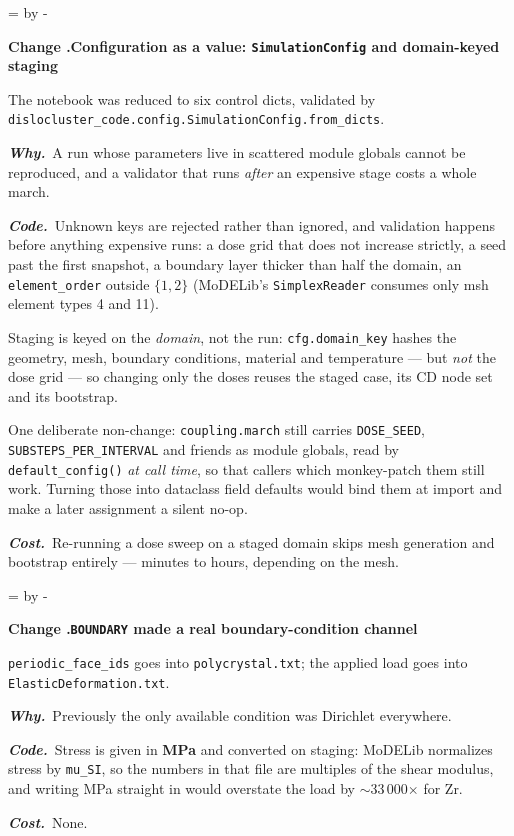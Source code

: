 \documentclass[11pt,a4paper]{article}
\newcommand{\code}[1]{\texttt{\small #1}}
\newcommand{\needlines}[1]{%
  \par\dimen0=\pagegoal \advance\dimen0 by -\pagetotal
  \ifdim\dimen0<#1\baselineskip \newpage \fi}
\newcounter{chg}
\newcommand{\change}[1]{%
  \needlines{4}%
  \refstepcounter{chg}%
  \par\medskip\noindent
  {\bfseries\boldmath Change \thechg.\quad #1}%
  \par\nobreak\smallskip}
\newcommand{\why}[1]{\par\noindent\textbf{\itshape Why.}\ #1\par}
\newcommand{\impact}[1]{\par\noindent\textbf{\itshape Code.}\ #1\par}
\newcommand{\cost}[1]{\par\noindent\textbf{\itshape Cost.}\ #1\par}
\begin{document}
\change{Configuration as a value: \code{SimulationConfig} and domain-keyed staging}
\label{chg:config}
The notebook was reduced to six control dicts, validated by
\code{dislocluster\_code.config.\allowbreak SimulationConfig.from\_dicts}.
\why{A run whose parameters live in scattered module globals cannot be
reproduced, and a validator that runs \emph{after} an expensive stage costs a
whole march.}
\impact{Unknown keys are rejected rather than ignored, and validation happens
before anything expensive runs: a dose grid that does not increase strictly, a
seed past the first snapshot, a boundary layer thicker than half the domain, an
\code{element\_order} outside $\{1,2\}$ (MoDELib's \code{SimplexReader}
consumes only msh element types 4 and 11).

Staging is keyed on the \emph{domain}, not the run: \code{cfg.domain\_key}
hashes the geometry, mesh, boundary conditions, material and temperature --- but
\emph{not} the dose grid --- so changing only the doses reuses the staged case,
its CD node set and its bootstrap.

One deliberate non-change: \code{coupling.march} still carries
\code{DOSE\_SEED}, \code{SUBSTEPS\_PER\_INTERVAL} and friends as module
globals, read by \code{default\_config()} \emph{at call time}, so that callers
which monkey-patch them still work. Turning those into dataclass field
defaults would bind them at import and make a later assignment a silent
no-op.}
\cost{Re-running a dose sweep on a staged domain skips mesh generation and
bootstrap entirely --- minutes to hours, depending on the mesh.}

\change{\code{BOUNDARY} made a real boundary-condition channel}
\label{chg:boundary}
\code{periodic\_face\_ids} goes into \code{polycrystal.txt}; the applied load
goes into \code{ElasticDeformation.txt}.
\why{Previously the only available condition was Dirichlet everywhere.}
\impact{Stress is given in \textbf{MPa} and converted on staging: MoDELib
normalizes stress by \code{mu\_SI}, so the numbers in that file are multiples
of the shear modulus, and writing MPa straight in would overstate the load by
$\sim$33\,000$\times$ for Zr.}
\cost{None.}
\end{document}

